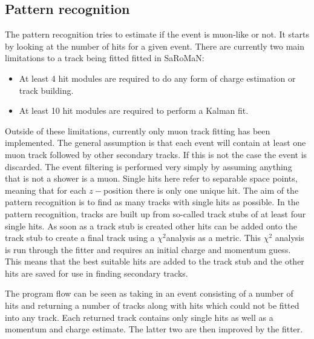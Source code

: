 \subsection{Pattern recognition}
The pattern recognition tries to estimate if the event is muon-like or not. It starts by looking at the number of hits for a given event. There are currently two main limitations to a track being fitted fitted in SaRoMaN:
\begin{itemize}
\item At least 4 hit modules are required to do any form of charge estimation or track building.
\item At least 10 hit modules are required to perform a Kalman fit.
\end{itemize}
Outside of these limitations, currently only muon track fitting has been implemented. The general assumption is that each event will contain at least one muon track followed by other secondary tracks. If this is not the case the event is discarded. The event filtering is performed very simply by assuming anything that is not a shower is a muon. Single hits here refer to separable space points, meaning that for each $z-$position there is only one unique hit. The aim of the pattern recognition is to find as many tracks with single hits as possible. In the pattern recognition, tracks are built up from so-called track stubs of at least four single hits. As soon as a track stub is created other hits can be added onto the track stub to create a final track using a $\chi^2$analysis as a metric. This $\chi^2$ analysis is run through the fitter and requires an initial charge and momentum guess. This means that the best suitable hits are added to the track stub and the other hits are saved for use in finding secondary tracks. 

The program flow can be seen as taking in an event consisting of a number of hits and returning a number of tracks along with hits which could not be fitted into any track. Each returned track contains only single hits as well as a momentum and charge estimate. The latter two are then improved by the fitter.


